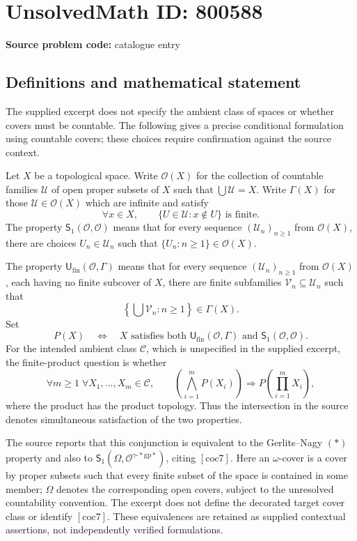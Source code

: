 \documentclass[11pt]{article}
\begin{document}
\section*{UnsolvedMath ID: 800588}
\textbf{Source problem code:} catalogue entry
\subsection{Definitions and mathematical statement}
The supplied excerpt does not specify the ambient class of spaces or whether covers must be countable. The following gives a precise conditional formulation using countable covers; these choices require confirmation against the source context.

Let \(X\) be a topological space. Write \(\mathcal{O}(X)\) for the collection of countable families \(\mathcal{U}\) of open proper subsets of \(X\) such that \(\bigcup\mathcal{U}=X\). Write \(\Gamma(X)\) for those \(\mathcal{U}\in\mathcal{O}(X)\) which are infinite and satisfy
\[
\forall x\in X,\qquad \{U\in\mathcal{U}:x\notin U\}\text{ is finite}.
\]
The property \(\mathsf{S}_1(\mathcal{O},\mathcal{O})\) means that for every sequence \((\mathcal{U}_n)_{n\geq 1}\) from \(\mathcal{O}(X)\), there are choices \(U_n\in\mathcal{U}_n\) such that \(\{U_n:n\geq 1\}\in\mathcal{O}(X)\).

The property \(\mathsf{U}_{\mathrm{fin}}(\mathcal{O},\Gamma)\) means that for every sequence \((\mathcal{U}_n)_{n\geq 1}\) from \(\mathcal{O}(X)\), each having no finite subcover of \(X\), there are finite subfamilies \(\mathcal{V}_n\subseteq\mathcal{U}_n\) such that
\[
\left\{\bigcup\mathcal{V}_n:n\geq 1\right\}\in\Gamma(X).
\]
Set
\[
P(X)\quad\Longleftrightarrow\quad
X\text{ satisfies both }\mathsf{U}_{\mathrm{fin}}(\mathcal{O},\Gamma)
\text{ and }\mathsf{S}_1(\mathcal{O},\mathcal{O}).
\]
For the intended ambient class \(\mathscr{C}\), which is unspecified in the supplied excerpt, the finite-product question is whether
\[
\forall m\geq 1\;\forall X_1,\ldots,X_m\in\mathscr{C},\qquad
\left(\bigwedge_{i=1}^{m}P(X_i)\right)
\Longrightarrow P\!\left(\prod_{i=1}^{m}X_i\right),
\]
where the product has the product topology. Thus the intersection in the source denotes simultaneous satisfaction of the two properties.

The source reports that this conjunction is equivalent to the Gerlits--Nagy \((*)\) property and also to
\(\mathsf{S}_1(\Omega,\mathcal{O}^{\gamma\text{-}*\mathrm{gp}*})\), citing \([\mathrm{coc7}]\). Here an \(\omega\)-cover is a cover by proper subsets such that every finite subset of the space is contained in some member; \(\Omega\) denotes the corresponding open covers, subject to the unresolved countability convention. The excerpt does not define the decorated target cover class or identify \([\mathrm{coc7}]\). These equivalences are retained as supplied contextual assertions, not independently verified formulations.
\end{document}
